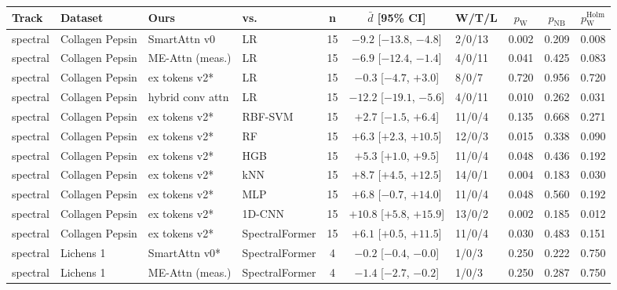 \small
\begin{tabular}{llllcclccc}
\toprule
Track & Dataset & Ours & vs. & n & $\bar d$ [95\% CI] & W/T/L & $p_{\mathrm{W}}$ & $p_{\mathrm{NB}}$ & $p_{\mathrm{W}}^{\mathrm{Holm}}$ \\
\midrule
spectral & Collagen Pepsin & SmartAttn v0 & LR & 15 & $-9.2$ [$-13.8$, $-4.8$] & 2/0/13 & 0.002 & 0.209 & 0.008 \\
spectral & Collagen Pepsin & ME-Attn (meas.) & LR & 15 & $-6.9$ [$-12.4$, $-1.4$] & 4/0/11 & 0.041 & 0.425 & 0.083 \\
spectral & Collagen Pepsin & ex tokens v2* & LR & 15 & $-0.3$ [$-4.7$, $+3.0$] & 8/0/7 & 0.720 & 0.956 & 0.720 \\
spectral & Collagen Pepsin & hybrid conv attn & LR & 15 & $-12.2$ [$-19.1$, $-5.6$] & 4/0/11 & 0.010 & 0.262 & 0.031 \\
spectral & Collagen Pepsin & ex tokens v2* & RBF-SVM & 15 & $+2.7$ [$-1.5$, $+6.4$] & 11/0/4 & 0.135 & 0.668 & 0.271 \\
spectral & Collagen Pepsin & ex tokens v2* & RF & 15 & $+6.3$ [$+2.3$, $+10.5$] & 12/0/3 & 0.015 & 0.338 & 0.090 \\
spectral & Collagen Pepsin & ex tokens v2* & HGB & 15 & $+5.3$ [$+1.0$, $+9.5$] & 11/0/4 & 0.048 & 0.436 & 0.192 \\
spectral & Collagen Pepsin & ex tokens v2* & kNN & 15 & $+8.7$ [$+4.5$, $+12.5$] & 14/0/1 & 0.004 & 0.183 & 0.030 \\
spectral & Collagen Pepsin & ex tokens v2* & MLP & 15 & $+6.8$ [$-0.7$, $+14.0$] & 11/0/4 & 0.048 & 0.560 & 0.192 \\
spectral & Collagen Pepsin & ex tokens v2* & 1D-CNN & 15 & $+10.8$ [$+5.8$, $+15.9$] & 13/0/2 & 0.002 & 0.185 & 0.012 \\
spectral & Collagen Pepsin & ex tokens v2* & SpectralFormer & 15 & $+6.1$ [$+0.5$, $+11.5$] & 11/0/4 & 0.030 & 0.483 & 0.151 \\
\midrule
spectral & Lichens 1 & SmartAttn v0* & SpectralFormer & 4 & $-0.2$ [$-0.4$, $-0.0$] & 1/0/3 & 0.250 & 0.222 & 0.750 \\
spectral & Lichens 1 & ME-Attn (meas.) & SpectralFormer & 4 & $-1.4$ [$-2.7$, $-0.2$] & 1/0/3 & 0.250 & 0.287 & 0.750 \\

\end{tabular}
